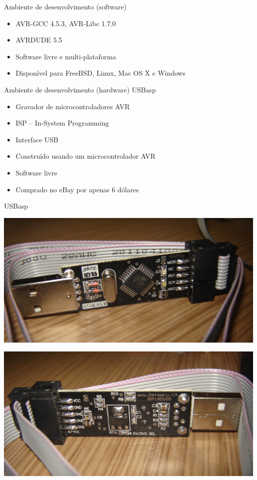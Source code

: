\documentclass{beamer}
\begin{document}
\begin{frame}{Ambiente de desenvolvimento (software)}
	\begin{itemize}
		\pause
		\item AVR-GCC 4.5.3, AVR-Libc 1.7.0
		\pause
		\item AVRDUDE 5.5
		\pause
		\item Software livre e multi-plataforma
		\pause
		\item Disponível para FreeBSD, Linux, Mac OS X \pause e Windows
	\end{itemize}
\end{frame}


\begin{frame}{Ambiente de desenvolvimento (hardware)}
	\pause
	USBasp
	\begin{itemize}
		\pause
		\item Gravador de microcontroladores AVR
		\pause
		\item ISP -- In-System Programming
		\pause
		\item Interface USB
		\pause
		\item Construído usando um microcontrolador AVR
		\pause
		\item Software livre
		\pause
		\item Comprado no eBay por apenas 6 dólares
	\end{itemize}
\end{frame}


\begin{frame}{USBasp}
	\begin{center}
		\includegraphics[height=0.4\textheight]{img/usbasp_top_hi.jpg}

		\includegraphics[height=0.4\textheight]{img/usbasp_bottom_hi.jpg}
	\end{center}
\end{frame}
\end{document}
